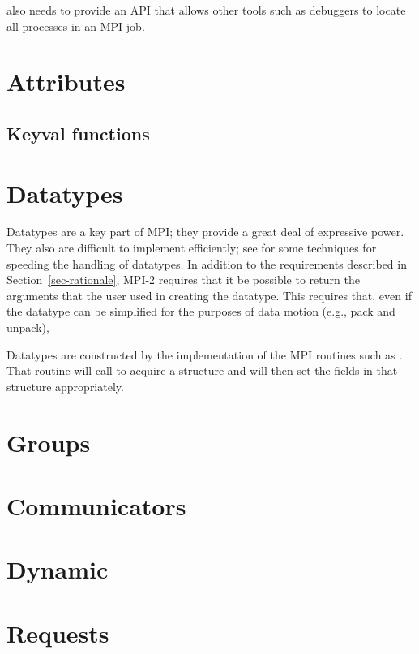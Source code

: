 \documentclass{article}
\begin{document}
 also needs to provide an API that allows other tools such as
debuggers to locate all processes in an MPI job.

\section{Attributes}

\subsection{Keyval functions}




\section{Datatypes}
Datatypes are a key part of MPI; they provide a great deal of expressive
power.  They also are difficult to implement efficiently; see 
\cite{gropp-swider-lusk99,Traeff:1999:FFE} for some techniques for speeding
the handling of datatypes.
In addition to the requirements described in Section~\ref{sec-rationale}, 
MPI-2 requires that it be possible to return the arguments that the user
used in creating the datatype.  This requires that, even if the datatype can
be simplified for the purposes of data motion (e.g., pack and unpack), 

Datatypes are constructed by the implementation of the MPI routines such as 
.  That routine will call
 to acquire a structure and will then set the fields
in that structure appropriately. 





\section{Groups}



\section{Communicators}


\section{Dynamic}


\section{Requests}

\end{document}

